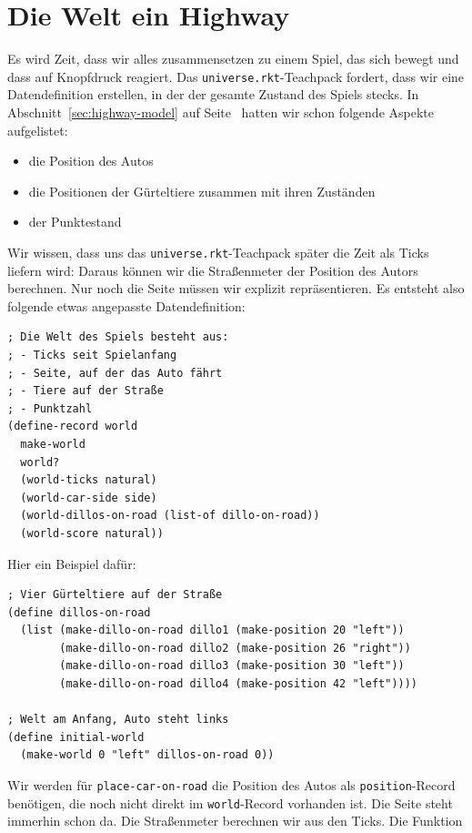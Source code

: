 \section{Die Welt ein Highway}

Es wird Zeit, dass wir alles zusammensetzen zu einem Spiel, das sich
bewegt und dass auf Knopfdruck reagiert.  Das
\texttt{universe.rkt}-Teachpack fordert, dass wir eine Datendefinition
erstellen, in der der gesamte Zustand des Spiels stecks.  In
Abschnitt~\ref{sec:highway-model} auf
Seite~\pageref{sec:highway-model} hatten wir schon folgende Aspekte
aufgelistet:
%
\begin{itemize}
\item die Position des Autos
\item die Positionen der Gürteltiere zusammen mit ihren Zuständen
\item der Punktestand
\end{itemize}
%
Wir wissen, dass uns das \texttt{universe.rkt}-Teachpack später die
Zeit als Ticks liefern wird: Daraus können wir die Straßenmeter der
Position des Autors berechnen.  Nur noch die Seite müssen wir explizit
repräsentieren.  Es entsteht also folgende etwas angepasste Datendefinition:
%
\begin{lstlisting}
; Die Welt des Spiels besteht aus:
; - Ticks seit Spielanfang
; - Seite, auf der das Auto fährt
; - Tiere auf der Straße
; - Punktzahl
(define-record world
  make-world
  world?
  (world-ticks natural)
  (world-car-side side)
  (world-dillos-on-road (list-of dillo-on-road))
  (world-score natural))
\end{lstlisting}
%
Hier ein Beispiel dafür:
%
\begin{lstlisting}
; Vier Gürteltiere auf der Straße
(define dillos-on-road
  (list (make-dillo-on-road dillo1 (make-position 20 "left"))
        (make-dillo-on-road dillo2 (make-position 26 "right"))
        (make-dillo-on-road dillo3 (make-position 30 "left"))
        (make-dillo-on-road dillo4 (make-position 42 "left"))))

; Welt am Anfang, Auto steht links
(define initial-world
  (make-world 0 "left" dillos-on-road 0))
\end{lstlisting}
%
Wir werden für \lstinline{place-car-on-road} die Position des Autos
als \lstinline{position}-Record benötigen, die noch nicht direkt im
\lstinline{world}-Record vorhanden ist.  Die Seite steht immerhin
schon da.  Die Straßenmeter berechnen wir aus den Ticks.  Die Funktion

